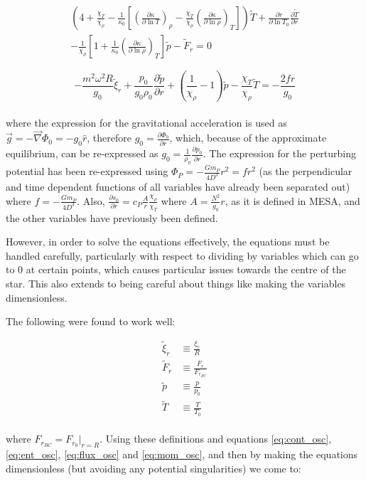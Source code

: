 \documentclass[11pt]{amsart}
\begin{document}
\begin{multline} \label{eq:flux_osc_dim}
\left( 4 + \frac{\chi_{T}}{\chi_{\rho}}  - \frac{1}{\kappa_{0}} \left[ \left( \frac{\partial \kappa}{\partial \ln T} \right)_{\rho} - \frac{\chi_{T}}{\chi_{\rho}} \left( \frac{\partial \kappa}{\partial \ln \rho} \right)_{T} \right] \right) \tilde{T} + \frac{\partial r}{\partial \ln T_{0}} \frac{\partial \tilde{T}}{\partial r}  \\
- \frac{1}{\chi_{\rho}} \left[ 1 + \frac{1}{\kappa_{0}} \left( \frac{\partial \kappa}{\partial \ln \rho} \right)_{T} \right] \tilde{p}
- \tilde{F}_{r}
=
0
\end{multline}

\begin{equation} \label{eq:mom_osc_dim}
- \frac{m^{2} \omega^{2} R }{g_{0}} \tilde{\xi}_{r} 
+ \frac{p_{0}}{g_{0} \rho_{0}} \frac{\partial \tilde{p}}{\partial r} + \left( \frac{1}{\chi_{\rho}} -  1 \right) \tilde{p}
- \frac{\chi_{T}}{\chi_{\rho}} \tilde{T}
=
- \frac{2 f r}{g_{0}}
\end{equation}
\\

where the expression for the gravitational acceleration  is used as $\vec{g} = - \vec{\nabla}\Phi_{0} = - g_{0} \hat{r}$, therefore $g_{0} = \frac{\partial \Phi_{0}}{\partial r}$, which, because of the approximate equilibrium, can be re-expressed as $g_{0} = \frac{1}{\rho_{0}} \frac{\partial p_{0}}{\partial r}$.
The expression for the perturbing potential has been re-expressed using $\Phi_{P} = - \frac{G m_{P}}{4 D^{3}} r^{2} = f r^{2}$ (as the perpendicular and time dependent functions of all variables have already been separated out) where $f = - \frac{G m_{P}}{4 D^{3}}$.  Also, $\frac{\partial s_{0}}{\partial r} = c_{P} \frac{A}{r} \frac{\chi_{\rho}}{\chi_{T}}$ where $A = \frac{N^{2}}{g_{0}} r$, as it is defined in MESA, and the other variables have previously been defined.



However, in order to solve the equations effectively, the equations must be handled carefully, particularly with respect to dividing by variables which can go to $0$ at certain points, which causes particular issues towards the centre of the star.  This also extends to being careful about things like making the variables dimensionless.

The following were found to work well:

\begin{align}
\tilde{\xi}_{r} &\equiv \frac{\xi_{r}}{R} \\
\tilde{F}_{r} &\equiv \frac{F_{r}}{F_{r_{BC}}} \\
\tilde{p} &\equiv \frac{p}{p_{0}} \\
\tilde{T} &\equiv \frac{T}{T_{0}}
\end{align}
\\
where $F_{r_{BC}} = F_{r_{0}} |_{r=R}$.  Using these definitions and equations \ref{eq:cont_osc}, \ref{eq:ent_osc}, \ref{eq:flux_osc} and \ref{eq:mom_osc}, and then by making the equations dimensionless (but avoiding any potential singularities) we come to:
\end{document}

